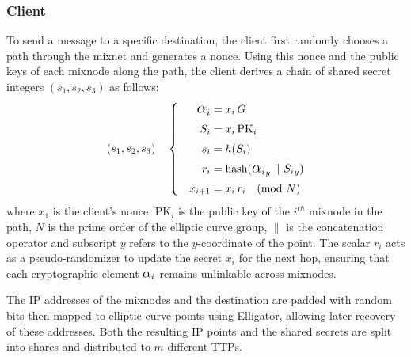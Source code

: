 \subsubsection{Client}
  
To send a message to a specific destination, the client first randomly chooses a path through the mixnet and generates a nonce.
Using this nonce and the public keys of each mixnode along the path, the client derives a chain of shared secret integers $ (s_1, s_2, s_3) $ as follows:
\begin{equation}
(s_1, s_2, s_3) \quad \left\{ \quad
\begin{aligned}
    \ALPHA_i    &= x_i \, G \\
    S_i         &= x_i \, \text{PK}_i \\
    s_i         &= h(S_i) \\
    r_i         &= \text{hash} ( {\ALPHA_i}_y \ \| \ {S_i}_y ) \\
    x_{i+1}     &= x_i \, r_i \quad (\text{mod}\ N)
\end{aligned}
\right.
\end{equation}
where $ x_1 $ is the client's nonce, $ \text{PK}_i $ is the public key of the $ i^{th} $ mixnode in the path, 
$ N $ is the prime order of the elliptic curve group, $ \| $ is  the concatenation operator and subscript $ y $ refers to the $ y $-coordinate of the point.
The scalar $ r_i $ acts as a pseudo-randomizer to update the secret $ x_i $ for the next hop, 
ensuring that each cryptographic element $ \ALPHA_i $ remains unlinkable across mixnodes.

The IP addresses of the mixnodes and the destination are padded with random bits
then mapped to elliptic curve points using Elligator, allowing later recovery of these addresses.
Both the resulting IP points and the shared secrets are split into shares and distributed to $ m $ different TTPs. 

